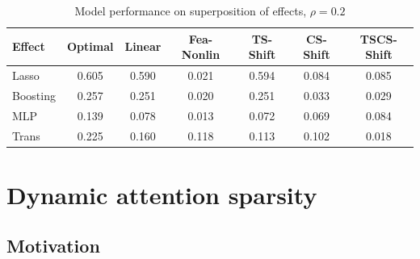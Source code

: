 \documentclass{article}
\begin{document}
\begin{table}[t]
    \centering
    \begin{tabular}{lcccccc}
\toprule
Effect & Optimal & Linear & Fea-Nonlin & TS-Shift & CS-Shift & TSCS-Shift \\
\midrule
Lasso & {\cellcolor[HTML]{B40426}} \color[HTML]{F1F1F1} 0.605 & {\cellcolor[HTML]{B40426}} \color[HTML]{F1F1F1} 0.590 & {\cellcolor[HTML]{516DDB}} \color[HTML]{F1F1F1} 0.021 & {\cellcolor[HTML]{B40426}} \color[HTML]{F1F1F1} 0.594 & {\cellcolor[HTML]{F59D7E}} \color[HTML]{000000} 0.084 & {\cellcolor[HTML]{B40426}} \color[HTML]{F1F1F1} 0.085 \\
Boosting & {\cellcolor[HTML]{8DB0FE}} \color[HTML]{000000} 0.257 & {\cellcolor[HTML]{ABC8FD}} \color[HTML]{000000} 0.251 & {\cellcolor[HTML]{4F69D9}} \color[HTML]{F1F1F1} 0.020 & {\cellcolor[HTML]{ADC9FD}} \color[HTML]{000000} 0.251 & {\cellcolor[HTML]{3B4CC0}} \color[HTML]{F1F1F1} 0.033 & {\cellcolor[HTML]{6F92F3}} \color[HTML]{F1F1F1} 0.029 \\
MLP & {\cellcolor[HTML]{3B4CC0}} \color[HTML]{F1F1F1} 0.139 & {\cellcolor[HTML]{3B4CC0}} \color[HTML]{F1F1F1} 0.078 & {\cellcolor[HTML]{3B4CC0}} \color[HTML]{F1F1F1} 0.013 & {\cellcolor[HTML]{3B4CC0}} \color[HTML]{F1F1F1} 0.072 & {\cellcolor[HTML]{E2DAD5}} \color[HTML]{000000} 0.069 & {\cellcolor[HTML]{B8122A}} \color[HTML]{F1F1F1} 0.084 \\
Trans & {\cellcolor[HTML]{7699F6}} \color[HTML]{F1F1F1} 0.225 & {\cellcolor[HTML]{6E90F2}} \color[HTML]{F1F1F1} 0.160 & {\cellcolor[HTML]{B40426}} \color[HTML]{F1F1F1} 0.118 & {\cellcolor[HTML]{536EDD}} \color[HTML]{F1F1F1} 0.113 & {\cellcolor[HTML]{B40426}} \color[HTML]{F1F1F1} 0.102 & {\cellcolor[HTML]{3B4CC0}} \color[HTML]{F1F1F1} 0.018 \\
\bottomrule
\end{tabular}
\vskip 0.05in
\caption{Model performance on superposition of effects, $\rho = 0.2$}
    \label{tab:model_performance2}
    \end{table}


\section{Dynamic attention sparsity}\label{sparsity}

\subsection{Motivation}\label{sparsity_motiv}
\end{document}
